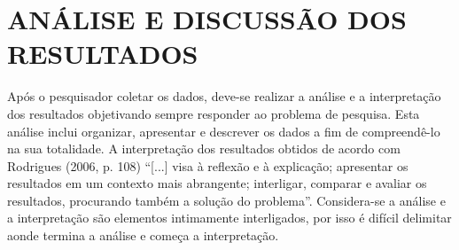 \chapter{ANÁLISE E DISCUSSÃO DOS RESULTADOS}
\label{resultados}
Após o pesquisador coletar os dados, deve-se realizar a análise e a interpretação dos resultados objetivando sempre responder ao problema de pesquisa. Esta análise inclui organizar, apresentar e descrever os dados a fim de compreendê-lo na sua totalidade. A interpretação dos resultados obtidos de acordo com Rodrigues (2006, p. 108) “[...] visa à reflexão e à explicação; apresentar os resultados em um contexto mais abrangente; interligar, comparar e avaliar os resultados, procurando também a solução do problema”. Considera-se a análise e a interpretação são elementos intimamente interligados, por isso é difícil delimitar aonde termina a análise e começa a interpretação.